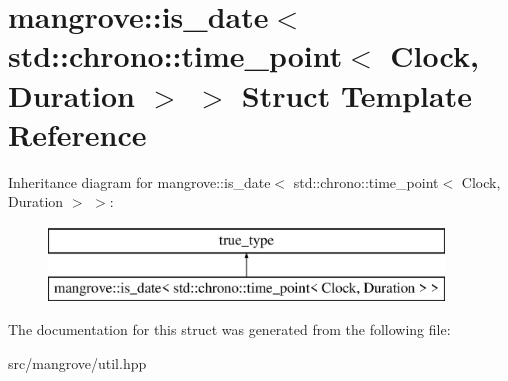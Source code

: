 \hypertarget{structmangrove_1_1is__date_3_01std_1_1chrono_1_1time__point_3_01Clock_00_01Duration_01_4_01_4}{}\section{mangrove\+:\+:is\+\_\+date$<$ std\+:\+:chrono\+:\+:time\+\_\+point$<$ Clock, Duration $>$ $>$ Struct Template Reference}
\label{structmangrove_1_1is__date_3_01std_1_1chrono_1_1time__point_3_01Clock_00_01Duration_01_4_01_4}
Inheritance diagram for mangrove\+:\+:is\+\_\+date$<$ std\+:\+:chrono\+:\+:time\+\_\+point$<$ Clock, Duration $>$ $>$\+:\begin{figure}[H]
\begin{center}
\leavevmode
\includegraphics[height=2.000000cm]{structmangrove_1_1is__date_3_01std_1_1chrono_1_1time__point_3_01Clock_00_01Duration_01_4_01_4}
\end{center}
\end{figure}


The documentation for this struct was generated from the following file\+:\begin{DoxyCompactItemize}
\item 
src/mangrove/util.\+hpp\end{DoxyCompactItemize}
